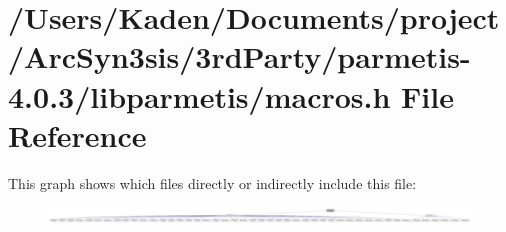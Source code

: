 \hypertarget{a00924}{}\section{/\+Users/\+Kaden/\+Documents/project/\+Arc\+Syn3sis/3rd\+Party/parmetis-\/4.0.3/libparmetis/macros.h File Reference}
\label{a00924}
This graph shows which files directly or indirectly include this file\+:\nopagebreak
\begin{figure}[H]
\begin{center}
\leavevmode
\includegraphics[width=350pt]{a00926}
\end{center}
\end{figure}
